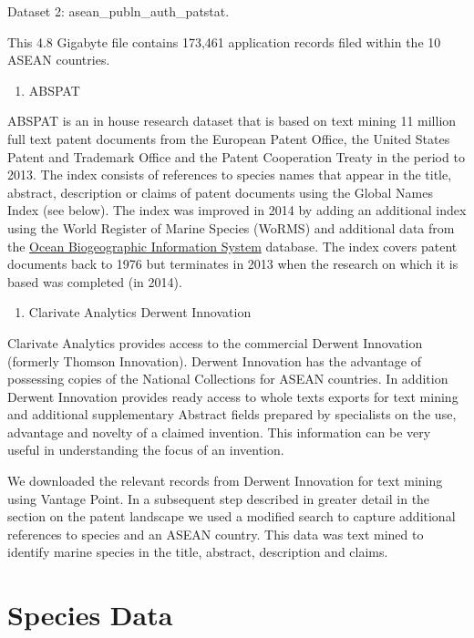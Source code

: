 \documentclass[]{book}
\providecommand{\tightlist}{%
  \setlength{\itemsep}{0pt}\setlength{\parskip}{0pt}}
\theoremstyle{definition}
\theoremstyle{definition}
\theoremstyle{definition}
\theoremstyle{remark}
\begin{document}
Dataset 2: asean\_publn\_auth\_patstat.

This 4.8 Gigabyte file contains 173,461 application records filed within
the 10 ASEAN countries.

\begin{enumerate}
\def\labelenumi{\arabic{enumi}.}
\setcounter{enumi}{1}
\tightlist
\item
  ABSPAT
\end{enumerate}

ABSPAT is an in house research dataset that is based on text mining 11
million full text patent documents from the European Patent Office, the
United States Patent and Trademark Office and the Patent Cooperation
Treaty in the period to 2013. The index consists of references to
species names that appear in the title, abstract, description or claims
of patent documents using the Global Names Index (see below). The index
was improved in 2014 by adding an additional index using the World
Register of Marine Species (WoRMS) and additional data from the
\href{http://www.iobis.org/}{Ocean Biogeographic Information System}
database. The index covers patent documents back to 1976 but terminates
in 2013 when the research on which it is based was completed (in 2014).

\begin{enumerate}
\def\labelenumi{\arabic{enumi}.}
\setcounter{enumi}{2}
\tightlist
\item
  Clarivate Analytics Derwent Innovation
\end{enumerate}

Clarivate Analytics provides access to the commercial Derwent Innovation
(formerly Thomson Innovation). Derwent Innovation has the advantage of
possessing copies of the National Collections for ASEAN countries. In
addition Derwent Innovation provides ready access to whole texts exports
for text mining and additional supplementary Abstract fields prepared by
specialists on the use, advantage and novelty of a claimed invention.
This information can be very useful in understanding the focus of an
invention.

We downloaded the relevant records from Derwent Innovation for text
mining using Vantage Point. In a subsequent step described in greater
detail in the section on the patent landscape we used a modified search
to capture additional references to species and an ASEAN country. This
data was text mined to identify marine species in the title, abstract,
description and claims.

\hypertarget{species-data}{%
\section{Species Data}\label{species-data}}
\end{document}
